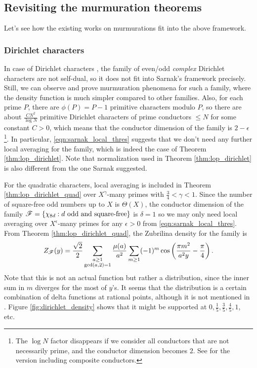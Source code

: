 \subsection{Revisiting the murmuration theorems}

Let's see how the existing works on murmurations fit into the above framework.

\subsubsection{Dirichlet characters}

In case of Dirichlet characters \cite{lee2025murmurations}, the family of even/odd \emph{complex} Dirichlet characters are not self-dual, so it does not fit into Sarnak's framework precisely.
Still, we can observe and prove murmuration phenomena for such a family, where the density function is much simpler compared to other families.
Also, for each prime $P$, there are $\phi(P) = P-1$ primitive characters modulo $P$, so there are about $\frac{CN^2}{\log N}$ primitive Dirichlet characters of prime conductors $\le N$ for some constant $C > 0$, which means that the conductor dimension of the family is $2-\epsilon$\footnote{The $\log N$ factor disappears if we consider all conductors that are not necessarily prime, and the conductor dimension becomes $2$. See \cite[Section 6]{lee2025murmurations} for the version including composite conductors.}.
In particular, \eqref{eqn:sarnak_local_thres} suggests that we don't need any further local averaging for the family, which is indeed the case of Theorem \ref{thm:lop_dirichlet}.
Note that normalization used in Theorem \ref{thm:lop_dirichlet} is also different from the one Sarnak suggested.

For the quadratic characters, local averaging is included in Theorem \ref{thm:lop_dirichlet_quad} over $X^{\gamma}$-many primes with $\frac{3}{4} < \gamma < 1$.
Since the number of square-free odd numbers up to $X$ is $\Theta(X)$, the conductor dimension of the family $\mathscr{F} = \{\chi_{8d} : d\text{ odd and square-free}\}$ is $\delta = 1$ so we may only need local averaging over $X^{\epsilon}$-many primes for any $\epsilon > 0$ from \eqref{eqn:sarnak_local_thres}.
From Theorem \ref{thm:lop_dirichlet_quad}, the Zubrilina density for the family is
\begin{equation}
    Z_{\mathscr{F}}(y) = \frac{\sqrt{2}}{2} \sum_{\substack{a \ge 1 \\ \gcd(a, 2) = 1}} \frac{\mu(a)}{a^2} \sum_{m \ge 1} (-1)^m \cos\left(\frac{\pi m^2}{a^2 y} - \frac{\pi}{4}\right).
\end{equation}
Note that this is not an actual function but rather a distribution, since the inner sum in $m$ diverges for the most of $y$'s.
It seems that the distribution is a certain combination of delta functions at rational points, although it is not mentioned in \cite{lee2025murmurations}.
Figure \ref{fig:dirichlet_density} shows that it might be supported at $0, \frac{1}{5}, \frac{3}{5}, \frac{4}{5}, 1$, etc.

